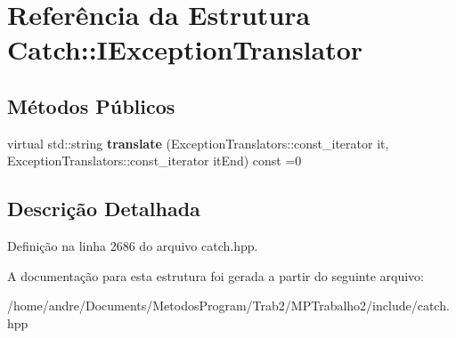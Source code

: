 \hypertarget{structCatch_1_1IExceptionTranslator}{}\section{Referência da Estrutura Catch\+:\+:I\+Exception\+Translator}
\label{structCatch_1_1IExceptionTranslator}
\subsection*{Métodos Públicos}
\begin{DoxyCompactItemize}
\item 
virtual std\+::string {\bfseries translate} (Exception\+Translators\+::const\+\_\+iterator it, Exception\+Translators\+::const\+\_\+iterator it\+End) const =0\hypertarget{structCatch_1_1IExceptionTranslator_a2a554b96ed5ed411e7c796b6b42837a5}{}\label{structCatch_1_1IExceptionTranslator_a2a554b96ed5ed411e7c796b6b42837a5}

\end{DoxyCompactItemize}


\subsection{Descrição Detalhada}


Definição na linha 2686 do arquivo catch.\+hpp.



A documentação para esta estrutura foi gerada a partir do seguinte arquivo\+:\begin{DoxyCompactItemize}
\item 
/home/andre/\+Documents/\+Metodos\+Program/\+Trab2/\+M\+P\+Trabalho2/include/catch.\+hpp\end{DoxyCompactItemize}
